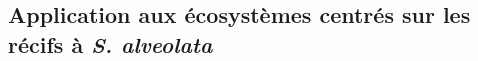 \documentclass[12pt]{report}
\begin{document}

        \subsection{Application aux écosystèmes centrés sur les récifs à \emph{S. alveolata}}
\end{document}
